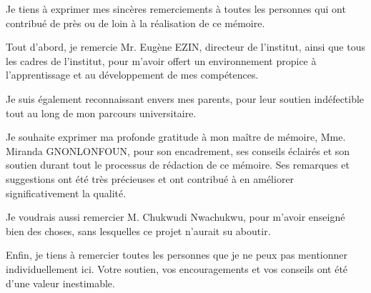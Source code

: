 \remerciements

Je tiens à exprimer mes sincères remerciements à toutes les personnes qui ont contribué de près ou de loin à la réalisation de ce mémoire. 

Tout d'abord, je remercie Mr. Eugène EZIN, directeur de l'institut, ainsi que tous les cadres de l'institut, pour m'avoir offert un environnement propice à l'apprentissage et au développement de mes compétences. 

Je suis également reconnaissant envers mes parents, pour leur soutien indéfectible tout au long de mon parcours universitaire.

Je souhaite exprimer ma profonde gratitude à mon maître de mémoire, Mme. Miranda \mbox{GNONLONFOUN}, pour son encadrement, 
ses conseils éclairés et son soutien durant tout le processus de rédaction de ce mémoire. 
Ses remarques et suggestions ont été très précieuses et ont contribué à en améliorer significativement la qualité.

Je voudrais aussi remercier M. Chukwudi Nwachukwu, pour m'avoir enseigné bien des choses, sans lesquelles ce projet n'aurait su aboutir.

Enfin, je tiens à remercier toutes les personnes que je ne peux pas mentionner individuellement ici. 
Votre soutien, vos encouragements et vos conseils ont été d'une valeur inestimable.